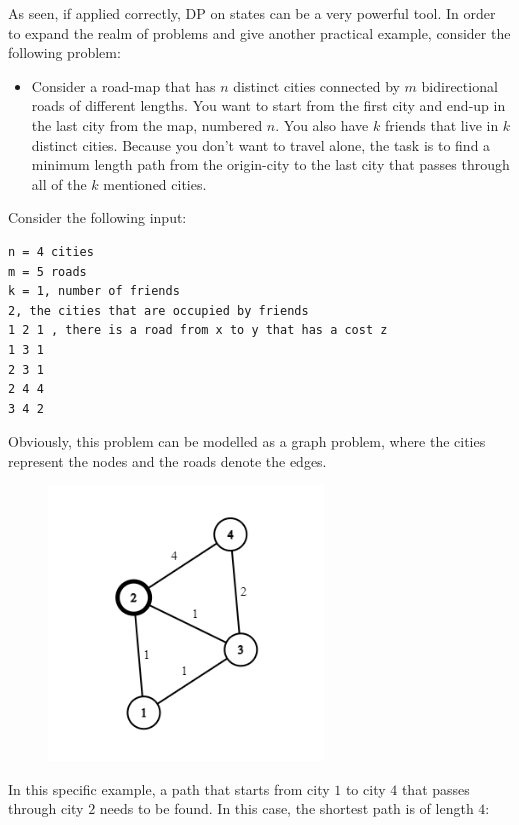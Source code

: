 \documentclass[letterpaper]{article}
\begin{document}
As seen, if applied correctly, DP on states can be a very powerful tool. In order to expand the realm of problems and give another practical example, consider the following problem:

\begin{itemize}
    \item Consider a road-map that has $n$ distinct cities connected by $m$ bidirectional roads of different lengths. You want to start from the first city and end-up in the last city from the map, numbered $n$. You also have $k$ friends that live in $k$ distinct cities. Because you don't want to travel alone, the task is to find a minimum length path from the origin-city to the last city that passes through all of the $k$ mentioned cities.
\end{itemize}

\newpage

Consider the following input:

\begin{lstlisting}
n = 4 cities
m = 5 roads
k = 1, number of friends
2, the cities that are occupied by friends
1 2 1 , there is a road from x to y that has a cost z
1 3 1
2 3 1
2 4 4
3 4 2
\end{lstlisting}

Obviously, this problem can be modelled as a graph problem, where the cities represent the nodes and the roads denote the edges. 

\begin{figure} [h!]
\centering
\includegraphics[width=0.65\textwidth]{pngOfDiagrams/ubuntzei.png}
\end{figure}

In this specific example, a path that starts from city $1$ to city $4$ that passes through city $2$ needs to be found. In this case, the shortest path is of length $4$:
\end{document}
